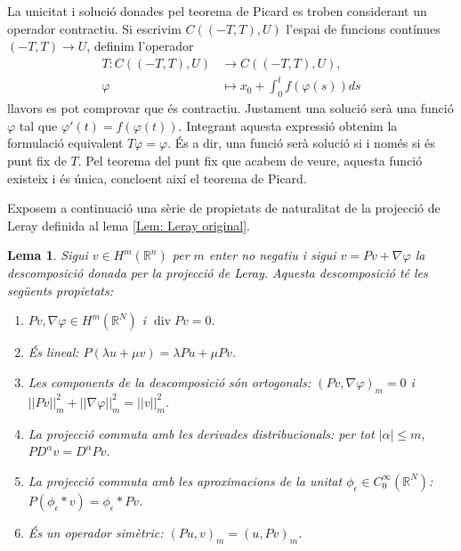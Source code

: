 \documentclass{article}
\numberwithin{equation}{section}
\DeclareMathOperator{\diver}{div}
\newtheorem{lema}{Lema}[section]
\begin{document}
La unicitat i soluci\'{o} donades pel teorema de Picard es troben considerant un operador contractiu. Si escrivim $C((-T,T),U)$ l'espai de funcions cont\'{i}nues $(-T,T)\rightarrow U$, definim l'operador
\begin{equation}
\begin{split}
T:C((-T,T),U)&\longrightarrow C((-T,T),U),\\
\varphi&\longmapsto x_0+\int_0^tf(\varphi(s))ds
\end{split}
\end{equation}
llavors es pot comprovar que \'{e}s contractiu. Justament una soluci\'{o} ser\`{a} una funci\'{o} $\varphi$ tal que $\varphi'(t)=f(\varphi(t))$. Integrant aquesta expressi\'{o} obtenim la formulaci\'{o} equivalent $T\varphi=\varphi$. \'{E}s a dir, una funci\'{o} ser\`{a} soluci\'{o} si i nom\'{e}s si \'{e}s punt fix de $T$. Pel teorema del punt fix que acabem de veure, aquesta funci\'{o} existeix i \'{e}s \'{u}nica, concloent aix\'{i} el teorema de Picard.
\vspace{3mm}

Exposem a continuaci\'{o} una s\`{e}rie de propietats de naturalitat de la projecci\'{o} de Leray definida al lema \ref{Lem: Leray original}.

\begin{lema}
Sigui $v\in H^m(\mathbb{R}^n)$ per $m$ enter no negatiu i sigui $v=Pv+\nabla\varphi$ la descomposici\'{o} donada per la projecci\'{o} de Leray. Aquesta descomposici\'{o} t\'{e} les seg\"{u}ents propietats:
\begin{enumerate}
\item $Pv,\nabla\varphi\in H^m(\mathbb{R}^N)$ i $\diver Pv=0$.
\item \'{E}s lineal: $P(\lambda u+\mu v)=\lambda Pu+\mu Pv$.
\item Les components de la descomposici\'{o} s\'{o}n ortogonals: $(Pv,\nabla\varphi)_m=0$ i $||Pv||_m^2+||\nabla\varphi||_m^2=||v||_m^2$.
\item La projecci\'{o} commuta amb les derivades distribucionals: per tot $|\alpha|\leq m$, $PD^{\alpha}v=D^{\alpha}Pv$.
\item La projecci\'{o} commuta amb les aproximacions de la unitat $\phi_{\epsilon}\in C_0^{\infty}(\mathbb{R}^N)$: $P(\phi_{\epsilon}*v)=\phi_{\epsilon}*Pv$.
\item \'{E}s un operador sim\`{e}tric: $(Pu,v)_m=(u,Pv)_m$.
\end{enumerate}
\end{lema}
\end{document}
